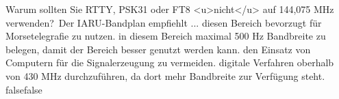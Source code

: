     {Warum sollten Sie RTTY, PSK31 oder FT8 <u>nicht</u> auf 144,075 MHz  verwenden? Der IARU-Bandplan empfiehlt ...}
    {diesen Bereich bevorzugt für Morsetelegrafie zu nutzen.}
    {in diesem Bereich maximal 500 Hz Bandbreite zu belegen, damit der Bereich besser genutzt werden kann.}
    {den Einsatz von Computern für die Signalerzeugung zu vermeiden.}
    {digitale Verfahren oberhalb von 430 MHz durchzuführen, da dort mehr Bandbreite zur Verfügung steht.}
    {false}{false}